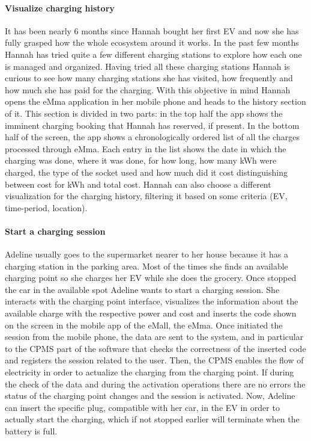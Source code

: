 \paragraph{Visualize charging history}
It has been nearly 6 months since Hannah bought her first EV and now she has fully grasped how the whole ecosystem around it works. In the past few months Hannah has tried quite a few different charging stations to explore how each one is managed and organized. Having tried all these charging stations Hannah is curious to see how many charging stations she has visited, how frequently and how much she has paid for the charging. With this objective in mind Hannah opens the eMma application in her mobile phone and heads to the history section of it. This section is divided in two parts: in the top half the app shows the imminent charging booking that Hannah has reserved, if present. In the bottom half of the screen, the app shows a chronologically ordered list of all the charges processed through eMma. Each entry in the list shows the date in which the charging was done, where it was done, for how long, how many kWh were charged, the type of the socket used and how much did it cost distinguishing between cost for kWh and total cost. Hannah can also choose a different visualization for the charging history, filtering it based on some criteria (EV, time-period, location).

\paragraph{Start a charging session}
Adeline usually goes to the supermarket nearer to her house because it has a charging station in the parking area. Most of the times she finds an available charging point so she charges her EV while she does the grocery. Once stopped the car in the available spot Adeline wants to start a charging session. She interacts with the charging point interface, visualizes the information about the available charge with the respective power and cost and inserts the code shown on the screen in the mobile app of the eMall, the eMma. Once initiated the session from the mobile phone, the data are sent to the system, and in particular to the CPMS part of the software that checks the correctness of the inserted code and registers the session related to the user. Then, the CPMS enables the flow of electricity in order to actualize the charging from the charging point. If during the check of the data and during the activation operations there are no errors the status of the charging point changes and the session is activated. Now, Adeline can insert the specific plug, compatible with her car, in the EV in order to actually start the charging, which if not stopped earlier will terminate when the battery is full.


